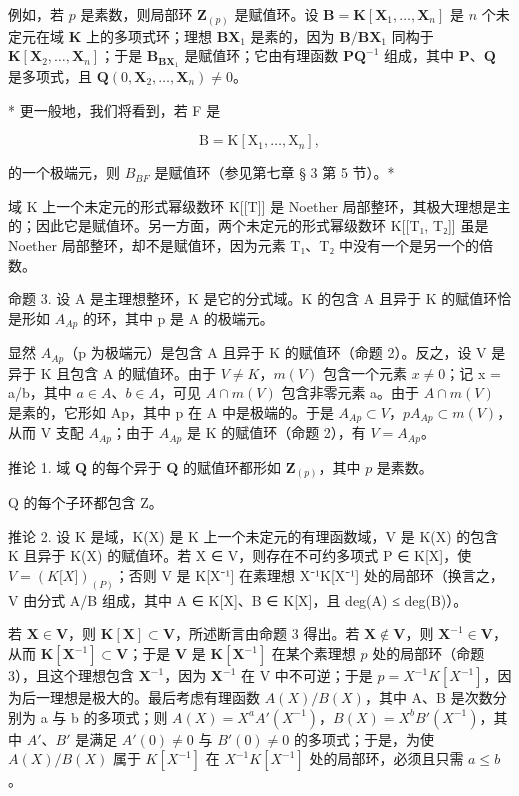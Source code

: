 例如，若 \(p\) 是素数，则局部环 \(\mathbf{Z}_{(p)}\) 是赋值环。设 \(\mathbf{B} = \mathbf{K}[\mathbf{X}_1, \ldots, \mathbf{X}_n]\) 是 \(n\) 个未定元在域 \(\mathbf{K}\) 上的多项式环；理想 \(\mathbf{BX}_1\) 是素的，因为 \(\mathbf{B} / \mathbf{BX}_1\) 同构于 \(\mathbf{K}[\mathbf{X}_2, \ldots, \mathbf{X}_n]\)；于是 \(\mathbf{B}_{\mathbf{BX}_1}\) 是赋值环；它由有理函数 \(\mathbf{PQ}^{-1}\) 组成，其中 \(\mathbf{P}\)、\(\mathbf{Q}\) 是多项式，且 \(\mathbf{Q}(0, \mathbf{X}_2, \ldots, \mathbf{X}_n) \neq 0\)。

* 更一般地，我们将看到，若 F 是

\[
\mathrm{B} = \mathrm{K} [ \mathrm{X} _ {1}, \dots , \mathrm{X} _ {n} ],
\]

的一个极端元，则 \(B_{BF}\) 是赋值环（参见第七章 § 3 第 5 节）。*

域 K 上一个未定元的形式幂级数环 K{[}{[}T{]}{]} 是 Noether 局部整环，其极大理想是主的；因此它是赋值环。另一方面，两个未定元的形式幂级数环 K{[}{[}T₁, T₂{]}{]} 虽是 Noether 局部整环，却不是赋值环，因为元素 T₁、T₂ 中没有一个是另一个的倍数。

命题 3. 设 A 是主理想整环，K 是它的分式域。K 的包含 A 且异于 K 的赋值环恰是形如 \(A_{Ap}\) 的环，其中 p 是 A 的极端元。

显然 \(A_{Ap}\)（p 为极端元）是包含 A 且异于 K 的赋值环（命题 2）。反之，设 V 是异于 K 且包含 A 的赋值环。由于 \(V \neq K\)，\(m(V)\) 包含一个元素 \(x \neq 0\)；记 x = a/b，其中 \(a \in A\)、\(b \in A\)，可见 \(A \cap m(V)\) 包含非零元素 a。由于 \(A \cap m(V)\) 是素的，它形如 Ap，其中 p 在 A 中是极端的。于是 \(A_{Ap} \subset V\)，\(pA_{Ap} \subset m(V)\)，从而 V 支配 \(A_{Ap}\)；由于 \(A_{Ap}\) 是 K 的赋值环（命题 2），有 \(V = A_{Ap}\)。

推论 1. 域 \(\mathbf{Q}\) 的每个异于 \(\mathbf{Q}\) 的赋值环都形如 \(\mathbf{Z}_{(p)}\)，其中 \(p\) 是素数。

Q 的每个子环都包含 Z。

推论 2. 设 K 是域，K(X) 是 K 上一个未定元的有理函数域，V 是 K(X) 的包含 K 且异于 K(X) 的赋值环。若 X ∈ V，则存在不可约多项式 P ∈ K{[}X{]}，使 \(V = (K{[}X{]})_{(P)}\)；否则 V 是 K{[}X⁻¹{]} 在素理想 X⁻¹K{[}X⁻¹{]} 处的局部环（换言之，V 由分式 A/B 组成，其中 A ∈ K{[}X{]}、B ∈ K{[}X{]}，且 deg(A) ≤ deg(B)）。

若 \(\mathbf{X} \in \mathbf{V}\)，则 \(\mathbf{K}[\mathbf{X}] \subset \mathbf{V}\)，所述断言由命题 3 得出。若 \(\mathbf{X} \notin \mathbf{V}\)，则 \(\mathbf{X}^{-1} \in \mathbf{V}\)，从而 \(\mathbf{K}[\mathbf{X}^{-1}] \subset \mathbf{V}\)；于是 \(\mathbf{V}\) 是 \(\mathbf{K}[\mathbf{X}^{-1}]\) 在某个素理想 \(p\) 处的局部环（命题 3），且这个理想包含 \(\mathbf{X}^{-1}\)，因为 \(\mathbf{X}^{-1}\) 在 V 中不可逆；于是 \(p = X^{-1}K[X^{-1}]\)，因为后一理想是极大的。最后考虑有理函数 \(A(X)/B(X)\)，其中 A、B 是次数分别为 a 与 b 的多项式；则 \(A(X) = X^{a}A'(X^{-1})\)，\(B(X) = X^{b}B'(X^{-1})\)，其中 \(A'\)、\(B'\) 是满足 \(A'(0) \neq 0\) 与 \(B'(0) \neq 0\) 的多项式；于是，为使 \(A(X)/B(X)\) 属于 \(K[X^{-1}]\) 在 \(X^{-1}K[X^{-1}]\) 处的局部环，必须且只需 \(a \leqslant b\)。


